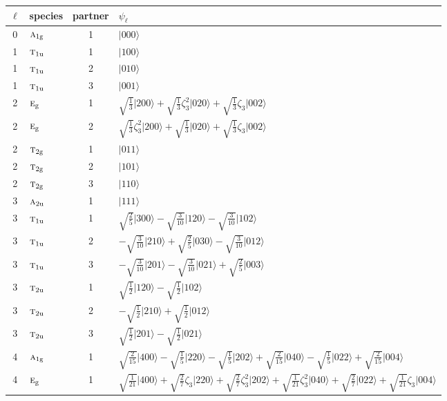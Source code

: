 \documentclass[11pt]{article}
\newcommand{\irr}[1]{\text{\normalfont\scshape #1}}
\newcommand{\ptag}[1]{\mathrm{#1}}
\newcommand{\rootunity}[1]{\zeta_{#1}}
\newcommand{\occ}[1]{\lvert #1\rangle}
\begin{document}
\begin{longtable}{c l c p{}}\hline $\ell$ & species & partner & $\psi_\ell$\\ \hline\endhead
0 & $\irr{a}_{1\ptag{g}}$ & 1 & $\occ{000}$\\
\hline
1 & $\irr{t}_{1\ptag{u}}$ & 1 & $\occ{100}$\\
1 & $\irr{t}_{1\ptag{u}}$ & 2 & $\occ{010}$\\
1 & $\irr{t}_{1\ptag{u}}$ & 3 & $\occ{001}$\\
\hline
2 & $\irr{e}_{\ptag{g}}$ & 1 & $\sqrt{\tfrac{1}{3}}\occ{200}+\sqrt{\tfrac{1}{3}}\rootunity{3}^{2}\occ{020}+\sqrt{\tfrac{1}{3}}\rootunity{3}\occ{002}$\\
2 & $\irr{e}_{\ptag{g}}$ & 2 & $\sqrt{\tfrac{1}{3}}\rootunity{3}^{2}\occ{200}+\sqrt{\tfrac{1}{3}}\occ{020}+\sqrt{\tfrac{1}{3}}\rootunity{3}\occ{002}$\\
2 & $\irr{t}_{2\ptag{g}}$ & 1 & $\occ{011}$\\
2 & $\irr{t}_{2\ptag{g}}$ & 2 & $\occ{101}$\\
2 & $\irr{t}_{2\ptag{g}}$ & 3 & $\occ{110}$\\
\hline
3 & $\irr{a}_{2\ptag{u}}$ & 1 & $\occ{111}$\\
3 & $\irr{t}_{1\ptag{u}}$ & 1 & $\sqrt{\tfrac{2}{5}}\occ{300}-\sqrt{\tfrac{3}{10}}\occ{120}-\sqrt{\tfrac{3}{10}}\occ{102}$\\
3 & $\irr{t}_{1\ptag{u}}$ & 2 & $-\sqrt{\tfrac{3}{10}}\occ{210}+\sqrt{\tfrac{2}{5}}\occ{030}-\sqrt{\tfrac{3}{10}}\occ{012}$\\
3 & $\irr{t}_{1\ptag{u}}$ & 3 & $-\sqrt{\tfrac{3}{10}}\occ{201}-\sqrt{\tfrac{3}{10}}\occ{021}+\sqrt{\tfrac{2}{5}}\occ{003}$\\
3 & $\irr{t}_{2\ptag{u}}$ & 1 & $\sqrt{\tfrac{1}{2}}\occ{120}-\sqrt{\tfrac{1}{2}}\occ{102}$\\
3 & $\irr{t}_{2\ptag{u}}$ & 2 & $-\sqrt{\tfrac{1}{2}}\occ{210}+\sqrt{\tfrac{1}{2}}\occ{012}$\\
3 & $\irr{t}_{2\ptag{u}}$ & 3 & $\sqrt{\tfrac{1}{2}}\occ{201}-\sqrt{\tfrac{1}{2}}\occ{021}$\\
\hline
4 & $\irr{a}_{1\ptag{g}}$ & 1 & $\sqrt{\tfrac{2}{15}}\occ{400}-\sqrt{\tfrac{1}{5}}\occ{220}-\sqrt{\tfrac{1}{5}}\occ{202}+\sqrt{\tfrac{2}{15}}\occ{040}-\sqrt{\tfrac{1}{5}}\occ{022}+\sqrt{\tfrac{2}{15}}\occ{004}$\\
4 & $\irr{e}_{\ptag{g}}$ & 1 & $\sqrt{\tfrac{1}{21}}\occ{400}+\sqrt{\tfrac{2}{7}}\rootunity{3}\occ{220}+\sqrt{\tfrac{2}{7}}\rootunity{3}^{2}\occ{202}+\sqrt{\tfrac{1}{21}}\rootunity{3}^{2}\occ{040}+\sqrt{\tfrac{2}{7}}\occ{022}+\sqrt{\tfrac{1}{21}}\rootunity{3}\occ{004}$\\

\end{longtable}
\end{document}
